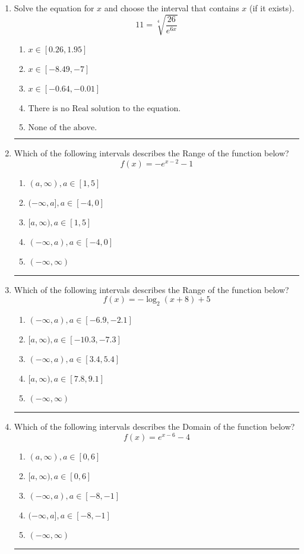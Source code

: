 \documentclass[14pt]{extbook}
\newcommand{\litem}[1]{\item#1\hspace*{-1cm}\rule{\textwidth}{0.4pt}}
\begin{document}
\begin{enumerate}
\litem{
 Solve the equation for $x$ and choose the interval that contains $x$ (if it exists).\[  11 = \sqrt[4]{\frac{26}{e^{6x}}} \]\begin{enumerate}[label=\Alph*.]
\item \( x \in [0.26, 1.95] \)
\item \( x \in [-8.49, -7] \)
\item \( x \in [-0.64, -0.01] \)
\item \( \text{There is no Real solution to the equation.} \)
\item \( \text{None of the above.} \)

\end{enumerate} }
\litem{
Which of the following intervals describes the Range of the function below?\[ f(x) = -e^{x-2}-1 \]\begin{enumerate}[label=\Alph*.]
\item \( (a, \infty), a \in [1, 5] \)
\item \( (-\infty, a], a \in [-4, 0] \)
\item \( [a, \infty), a \in [1, 5] \)
\item \( (-\infty, a), a \in [-4, 0] \)
\item \( (-\infty, \infty) \)

\end{enumerate} }
\litem{
Which of the following intervals describes the Range of the function below?\[ f(x) = -\log_2{(x+8)}+5 \]\begin{enumerate}[label=\Alph*.]
\item \( (-\infty, a), a \in [-6.9, -2.1] \)
\item \( [a, \infty), a \in [-10.3, -7.3] \)
\item \( (-\infty, a), a \in [3.4, 5.4] \)
\item \( [a, \infty), a \in [7.8, 9.1] \)
\item \( (-\infty, \infty) \)

\end{enumerate} }
\litem{
Which of the following intervals describes the Domain of the function below?\[ f(x) = e^{x-6}-4 \]\begin{enumerate}[label=\Alph*.]
\item \( (a, \infty), a \in [0, 6] \)
\item \( [a, \infty), a \in [0, 6] \)
\item \( (-\infty, a), a \in [-8, -1] \)
\item \( (-\infty, a], a \in [-8, -1] \)
\item \( (-\infty, \infty) \)


\end{enumerate}}
\end{enumerate}
\end{document}

